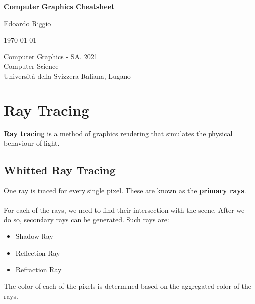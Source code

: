 \documentclass{article}
\begin{document}
\begin{titlepage}
    \begin{center}
        \vspace*{1cm}
        
        \Huge
        \textbf{Computer Graphics Cheatsheet}
        
        \vspace{0.5cm}
        \LARGE
        
        \vspace{.5cm}
        
        Edoardo Riggio
   		  \vspace{1.5cm}
       
        \vfill
        
        \today
        
        \vspace{.8cm}
          \Large
          Computer Graphics - SA. 2021 \\
        Computer Science\\
        Universit\`{a} della Svizzera Italiana, Lugano\\
        
    \end{center}
\end{titlepage}

\tableofcontents

\newpage

\section{Ray Tracing}
\textbf{Ray tracing} is a method of graphics rendering that simulates the physical behaviour of light.

\subsection{Whitted Ray Tracing}
One ray is traced for every single pixel. These are known as the \textbf{primary rays}. \\ \\
For each of the rays, we need to find their intersection with the scene. After we do so, secondary rays can be generated. Such rays are:

\begin{itemize}
	\item Shadow Ray
	\item Reflection Ray
	\item Refraction Ray
\end{itemize}
The color of each of the pixels is determined based on the aggregated color of the rays.
\end{document}
